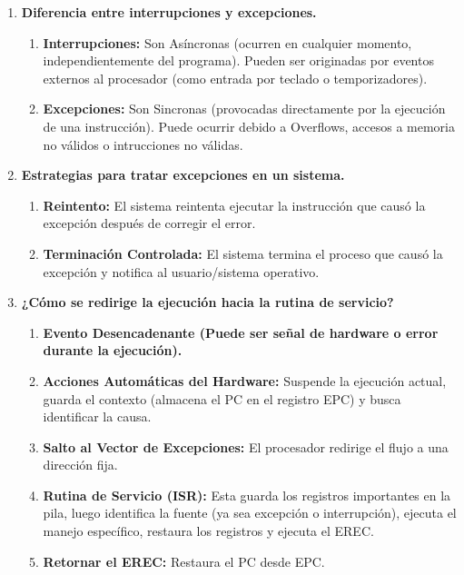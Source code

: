 \documentclass{article}
\begin{document}
\begin{enumerate}
    \item \textbf{Diferencia entre interrupciones y excepciones.}
    \begin{enumerate}
        \item \textbf{Interrupciones: }Son Asíncronas (ocurren en cualquier momento, independientemente del programa). Pueden ser originadas por eventos externos al procesador (como entrada por teclado o temporizadores).

        \item \textbf{Excepciones: }Son Sincronas (provocadas directamente por la ejecución de una instrucción). Puede ocurrir debido a Overflows, accesos a memoria no válidos o intrucciones no válidas.
    \end{enumerate}
    
    \item \textbf{Estrategias para tratar excepciones en un sistema.}

    \begin{enumerate}
        \item \textbf{Reintento: }El sistema reintenta ejecutar la instrucción que causó la excepción después de corregir el error.
        
        \item \textbf{Terminación Controlada: }El sistema termina el proceso que causó la excepción y notifica al usuario/sistema operativo.
    \end{enumerate}

    \item \textbf{¿Cómo se redirige la ejecución hacia la rutina de servicio?}

    \begin{enumerate}
        \item \textbf{Evento Desencadenante (Puede ser señal de hardware o error durante la ejecución).}
        \item \textbf{Acciones Automáticas del Hardware: }Suspende la ejecución actual, guarda el contexto (almacena el PC en el registro EPC) y busca identificar la causa.
        \item \textbf{Salto al Vector de Excepciones: }El procesador redirige el flujo a una dirección fija.
        \item \textbf{Rutina de Servicio (ISR): }Esta guarda los registros importantes en la pila, luego identifica la fuente (ya sea excepción o interrupción), ejecuta el manejo específico, restaura los registros y ejecuta el EREC.
        \item \textbf{Retornar el EREC: }Restaura el PC desde EPC.
    \end{enumerate}
\end{enumerate}
\end{document}
